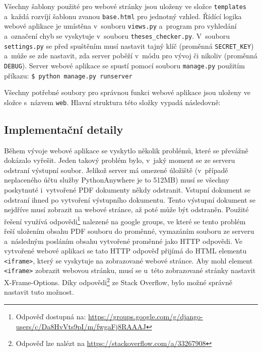 Všechny šablony použité pro webové stránky jsou uloženy ve
složce \texttt{templates} a~každá rozvíjí šablonu zvanou \texttt{base.html}
pro jednotný vzhled. Řídící logika webové aplikace je umístěna v~souboru
\texttt{views.py} a~program pro vyhledání a~označení chyb se vyskytuje 
v~souboru \texttt{theses\_checker.py}. V~souboru \texttt{settings.py}
se před spuštěním musí nastavit tajný klíč (proměnná \texttt{SECRET\_KEY}) 
a~může se zde nastavit, zda server poběží v~módu pro vývoj či nikoliv
(proměnná \texttt{DEBUG}). Server webové aplikace se spustí
pomocí souboru \texttt{manage.py} použitím
příkazu: \verb|$ python manage.py runserver|

Všechny potřebné soubory pro správnou funkci webové aplikace jsou uloženy
ve složce s~názvem \texttt{web}. Hlavní struktura této složky vypadá následovně:




\subsection*{Implementační detaily}
Během vývoje webové aplikace se vyskytlo několik problémů, které se převážně
dokázalo vyřešit. Jeden takový problém bylo, v~jaký moment se ze serveru odstraní
výstupní soubor. Jelikož server má omezené úložiště (v~případě neplaceného účtu
služby PythonAnywhere je to 512\;MB) musí se všechny poskytnuté i~vytvořené PDF
dokumenty někdy odstranit. Vstupní dokument se odstraní ihned po vytvoření
výstupního dokumentu. Tento výstupní dokument se nejdříve musí zobrazit na
webové stránce, až poté může být odstraněn. Použité řešení využívá
odpovědi\footnote{
    Odpověď dostupná na:
    \href{https://groups.google.com/g/django-users/c/Da8HvVts9pI/m/fwgaFj8RAAAJ}{https://groups.google.com/g/django-users/c/Da8HvVts9pI/m/fwgaFj8RAAAJ}
} nalezené na google groups, ve které se tento problém řeší uložením
obsahu PDF souboru do proměnné, vymazáním souboru ze serveru a~následným posláním 
obsahu vytvořené proměnné jako HTTP odpovědi. Ve vytvořené webové aplikaci se tato
HTTP odpověď přijímá do HTML elementu \texttt{<iframe>}, který se vyskytuje na
zobrazované webové stránce. Aby mohl element \texttt{<iframe>} zobrazit webovou
stránku, musí se u~této zobrazované stránky nastavit X-Frame-Options. Díky
odpovědi\footnote{
    Odpověď lze nalézt na 
    \href{https://stackoverflow.com/a/33267908}{https://stackoverflow.com/a/33267908}
} ze Stack Overflow, bylo možné správně nastavit tuto možnost. 

